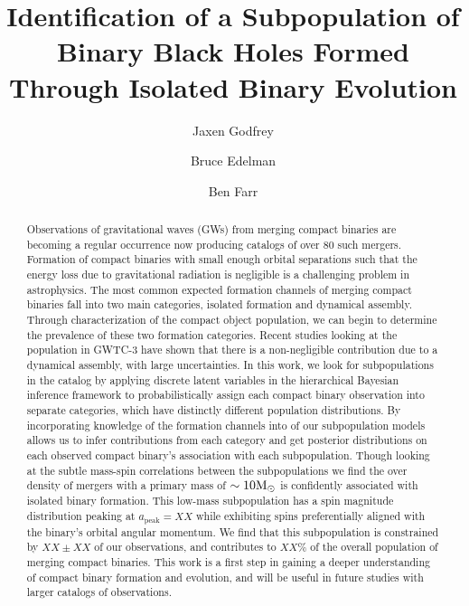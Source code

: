 \documentclass[twocolumn, linenumbers]{aastex631}
\newcommand{\msun}{\ensuremath{{\rm M}_\odot}}
\begin{document}
\title{Identification of a Subpopulation of Binary Black Holes Formed Through Isolated Binary Evolution}

\author{Jaxen Godfrey}
\author{Bruce Edelman}
\author{Ben Farr}

\begin{abstract}
    Observations of gravitational waves (GWs) from merging compact binaries are becoming a regular occurrence now producing catalogs of over 80 such mergers. Formation of compact binaries with small enough orbital separations such that the energy loss due to gravitational radiation is negligible is a challenging problem in astrophysics. The most common expected formation channels of merging compact binaries fall into two main categories, isolated formation and dynamical assembly. Through characterization of the compact object population, we can begin to determine the prevalence of these two formation categories. Recent studies looking at the population in GWTC-3 have shown that there is a non-negligible contribution due to a dynamical assembly, with large uncertainties. In this work, we look for subpopulations in the catalog by applying discrete latent variables in the hierarchical Bayesian inference framework to probabilistically assign each compact binary observation into separate categories, which have distinctly different population distributions. By incorporating knowledge of the formation channels into of our subpopulation models allows us to infer contributions from each category and get posterior distributions on each observed compact binary's association with each subpopulation. Though looking at the subtle mass-spin correlations between the subpopulations we find the over density of mergers with a primary mass of $\sim10\msun$ is confidently associated with isolated binary formation. This low-mass subpopulation has a spin magnitude distribution peaking at $a_\mathrm{peak}=XX$ while exhibiting spins preferentially aligned with the binary's orbital angular momentum. We find that this subpopulation is constrained by $XX \pm XX$ of our observations, and contributes to $XX\%$ of the overall population of merging compact binaries. This work is a first step in gaining a deeper understanding of compact binary formation and evolution, and will be useful in future studies with larger catalogs of observations. 
\end{abstract}
\end{document}
